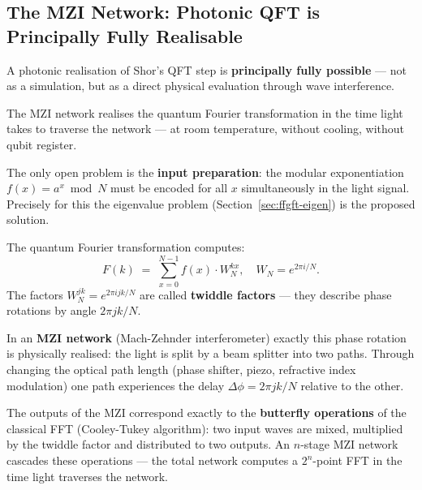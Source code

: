 \subsection{The MZI Network: Photonic QFT is Principally Fully Realisable}
\label{sec:mzi-qft}

\begin{keypoint}
A photonic realisation of Shor's QFT step
is \textbf{principally fully possible} ---
not as a simulation, but as a direct physical
evaluation through wave interference.

The MZI network realises the quantum Fourier transformation
in the time light takes to traverse the network ---
at room temperature, without cooling, without qubit register.

The only open problem is the \textbf{input preparation}:
the modular exponentiation $f(x) = a^x \bmod N$
must be encoded for all $x$ simultaneously in the light signal.
Precisely for this the eigenvalue problem (Section~\ref{sec:ffgft-eigen})
is the proposed solution.
\end{keypoint}

The quantum Fourier transformation computes:
\begin{equation}
  F(k) \;=\; \sum_{x=0}^{N-1} f(x)\cdot W_N^{kx},
  \quad W_N = e^{2\pi i/N}.
\end{equation}
The factors $W_N^{jk} = e^{2\pi i jk/N}$ are called
\textbf{twiddle factors} --- they describe
phase rotations by angle $2\pi jk/N$.

In an \textbf{MZI network} (Mach-Zehnder interferometer)
exactly this phase rotation is physically realised:
the light is split by a beam splitter into two paths.
Through changing the optical path length
(phase shifter, piezo, refractive index modulation)
one path experiences the delay $\Delta\phi = 2\pi jk/N$
relative to the other.

The outputs of the MZI correspond exactly to the
\textbf{butterfly operations} of the classical FFT
(Cooley-Tukey algorithm): two input waves are
mixed, multiplied by the twiddle factor and
distributed to two outputs. An $n$-stage MZI network
cascades these operations --- the total network
computes a $2^n$-point FFT in the time light
traverses the network.


